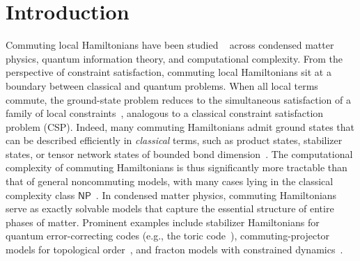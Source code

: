 \documentclass[11pt]{article}
\theoremstyle{plain}
\begin{document}
\section{Introduction}
\label{sec:introduction}
Commuting local Hamiltonians have been studied ~\cite{bravyi2004commutativeversionklocalhamiltonian,aharonov2011complexity,schuch2011complexitycommutinghamiltonianssquare,AKV,irani2023commutinglocalhamiltonianproblem,bostanci2025commutinglocalhamiltonians2d} across condensed matter physics, quantum information theory, and computational complexity. From the perspective of constraint satisfaction, commuting local Hamiltonians sit at a boundary between classical and quantum problems.  When all local terms commute, the ground-state problem reduces to the simultaneous satisfaction of a family of local constraints~\cite{bravyi2004commutativeversionklocalhamiltonian}, analogous to a classical constraint satisfaction problem (CSP). Indeed, many commuting Hamiltonians admit ground states that can be described efficiently in \emph{classical} terms, such as product states, stabilizer states, or tensor network states of bounded bond dimension~\cite{Gharibian_2015}. The computational complexity of commuting Hamiltonians is thus significantly more tractable than that of general noncommuting models, with many cases lying in the classical complexity class $\mathsf{NP}$~\cite{bravyi2004commutativeversionklocalhamiltonian,irani2023commutinglocalhamiltonianproblem,bostanci2025commutinglocalhamiltonians2d}.
In condensed matter physics, commuting Hamiltonians serve as exactly solvable models that capture the essential structure of entire phases of matter.  Prominent examples include stabilizer Hamiltonians for quantum error-correcting codes (e.g., the toric code~\cite{Kitaev_2003}), commuting-projector models for topological order~\cite{Levin_2005}, and fracton models with constrained dynamics~\cite{Vijay_2016}. 
\end{document}
